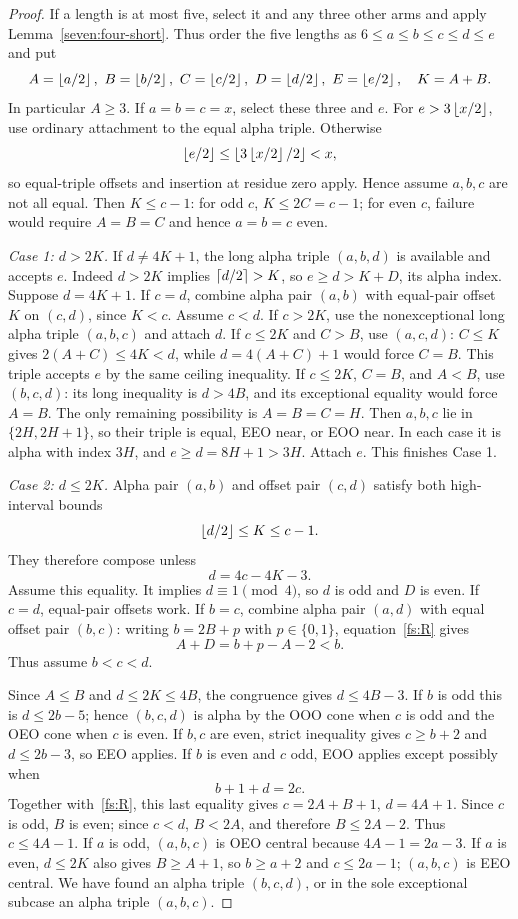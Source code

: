 \begin{proof}
If a length is at most five, select it and any three other arms and apply Lemma~\ref{seven:four-short}. Thus order the five lengths as $6\le a\le b\le c\le d\le e$ and put
\[
A=\floor{a/2},\ B=\floor{b/2},\ C=\floor{c/2},\
D=\floor{d/2},\ E=\floor{e/2},\quad K=A+B.
\]
In particular $A\ge3$.
If $a=b=c=x$, select these three and $e$. For $e>3\left\lfloor x/2\right\rfloor$, use ordinary attachment to the equal alpha triple. Otherwise
\[
\left\lfloor e/2\right\rfloor\le\left\lfloor 3\left\lfloor x/2\right\rfloor/2\right\rfloor<x,
\]
so equal-triple offsets and insertion at residue zero apply. Hence assume $a,b,c$ are not all equal. Then $K\le c-1$: for odd $c$, $K\le2C=c-1$; for even $c$, failure would require $A=B=C$ and hence $a=b=c$ even.

\medskip\noindent\textit{Case 1: $d>2K$.}
If $d\ne4K+1$, the long alpha triple $(a,b,d)$ is available and accepts $e$. Indeed $d>2K$ implies $\left\lceil d/2\right\rceil>K$, so $e\ge d>K+D$, its alpha index.
Suppose $d=4K+1$. If $c=d$, combine alpha pair $(a,b)$ with equal-pair offset $K$ on $(c,d)$, since $K<c$. Assume $c<d$.
If $c>2K$, use the nonexceptional long alpha triple $(a,b,c)$ and attach $d$. If $c\le2K$ and $C>B$, use $(a,c,d)$: $C\le K$ gives $2(A+C)\le4K<d$, while $d=4(A+C)+1$ would force $C=B$. This triple accepts $e$ by the same ceiling inequality. If $c\le2K$, $C=B$, and $A<B$, use $(b,c,d)$: its long inequality is $d>4B$, and its exceptional equality would force $A=B$.
The only remaining possibility is $A=B=C=H$. Then $a,b,c$ lie in $\{2H,2H+1\}$, so their triple is equal, EEO near, or EOO near. In each case it is alpha with index $3H$, and $e\ge d=8H+1>3H$. Attach $e$. This finishes Case 1.

\medskip\noindent\textit{Case 2: $d\le2K$.}
Alpha pair $(a,b)$ and offset pair $(c,d)$ satisfy both high-interval bounds
\[
\left\lfloor d/2\right\rfloor\le K\le c-1.
\]
They therefore compose unless
\begin{equation}\label{fs:R}
d=4c-4K-3.
\end{equation}
Assume this equality. It implies $d\equiv1\pmod4$, so $d$ is odd and $D$ is even. If $c=d$, equal-pair offsets work. If $b=c$, combine alpha pair $(a,d)$ with equal offset pair $(b,c)$: writing $b=2B+p$ with $p\in\{0,1\}$, equation~\eqref{fs:R} gives
\[
A+D=b+p-A-2<b.
\]
Thus assume $b<c<d$.

Since $A\le B$ and $d\le2K\le4B$, the congruence gives $d\le4B-3$. If $b$ is odd this is $d\le2b-5$; hence $(b,c,d)$ is alpha by the OOO cone when $c$ is odd and the OEO cone when $c$ is even. If $b,c$ are even, strict inequality gives $c\ge b+2$ and $d\le2b-3$, so EEO applies. If $b$ is even and $c$ odd, EOO applies except possibly when
\begin{equation}\label{fs:H}
b+1+d=2c.
\end{equation}
Together with~\eqref{fs:R}, this last equality gives $c=2A+B+1$, $d=4A+1$. Since $c$ is odd, $B$ is even; since $c<d$, $B<2A$, and therefore $B\le2A-2$. Thus $c\le4A-1$. If $a$ is odd, $(a,b,c)$ is OEO central because $4A-1=2a-3$. If $a$ is even, $d\le2K$ also gives $B\ge A+1$, so $b\ge a+2$ and $c\le2a-1$; $(a,b,c)$ is EEO central. We have found an alpha triple $(b,c,d)$, or in the sole exceptional subcase an alpha triple $(a,b,c)$.


\end{proof}

